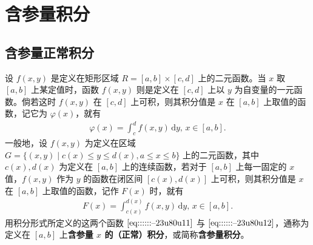 \documentclass[../../main.tex]{subfiles}%
\begin{document}
\section{含参量积分}

\subsection{含参量正常积分}

\begin{definition}[含参量积分]
设 \( f(x,y) \) 是定义在矩形区域 \( R = [a,b] \times [c,d] \) 上的二元函数。当 \( x \) 取 \( [a,b] \) 上某定值时，函数 \( f(x,y) \) 则是定义在 \( [c,d] \) 上以 \( y \) 为自变量的一元函数。倘若这时 \( f(x,y) \) 在 \( [c,d] \) 上可积，则其积分值是 \( x \) 在 \( [a,b] \) 上取值的函数，记它为 \( \varphi(x) \)，就有
\begin{align}
\varphi(x) = \int_{c}^{d} f(x,y) \, \mathrm{d}y, \, x \in [a,b]. \label{eq::::::--23u80u11}
\end{align}
一般地，设 \( f(x,y) \) 为定义在区域 \( G = \{ (x,y) \mid c(x) \leqslant y \leqslant d(x), a \leqslant x \leqslant b \} \) 上的二元函数，其中 \( c(x), d(x) \) 为定义在 \( [a,b] \) 上的连续函数，若对于 \( [a,b] \) 上每一固定的 \( x \) 值，\( f(x,y) \) 作为 \( y \) 的函数在闭区间 \( [c(x),d(x)] \) 上可积，则其积分值是 \( x \) 在 \( [a,b] \) 上取值的函数，记作 \( F(x) \) 时，就有
\begin{align}
F(x) = \int_{c(x)}^{d(x)} f(x,y) \, \mathrm{d}y, \, x \in [a,b]. \label{eq::::::--23u80u12}
\end{align}
用积分形式所定义的这两个函数 \(\eqref{eq::::::--23u80u11}\) 与 \(\eqref{eq::::::--23u80u12}\)，通称为定义在 \( [a,b] \) 上\textbf{含参量 \( x \) 的（正常）积分}，或简称\textbf{含参量积分}。
\end{definition}
\end{document}
